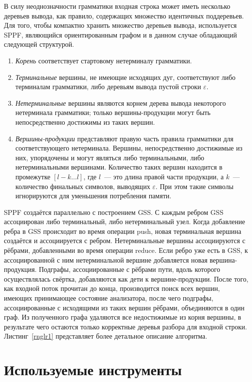 В силу неоднозначности грамматики входная строка может иметь несколько деревьев вывода, как правило, содержащих множество идентичных поддеревьев. Для того, чтобы компактно хранить множество деревьев вывода, используется SPPF, являющийся ориентированным графом и в данном случае обладающий следующей структурой.
\begin{enumerate}
  \item \emph{Корень} соответствует стартовому нетерминалу грамматики.
  \item \emph{Терминальные} вершины, не имеющие исходящих дуг, соответствуют либо терминалам грамматики, либо деревьям вывода пустой строки $\varepsilon$.
  \item \emph{Нетерминальные} вершины являются корнем дерева вывода некоторого нетерминала грамматики; только вершины-продукции могут быть непосредственно достижимы из таких вершин.
  \item \emph{Вершины-продукции} представляют правую часть правила грамматики для соответствующего нетерминала. Вершины, непосредственно достижимые из них, упорядочены и могут являться либо терминальными, либо нетерминальными вершинами. Количество таких вершин находится в промежутке $[l - k \dots l]$, где $l$~--- это длина правой части продукции, а $k$~--- количество финальных символов, выводящих $\varepsilon$. При этом такие символы игнорируются для уменьшения потребления памяти.
\end{enumerate}

SPPF создаётся параллельно с построением GSS. С каждым ребром GSS ассоциирован либо терминальный, либо нетерминальный узел. Когда добавление ребра в GSS происходит во время операции push, новая терминальная вершина создаётся и ассоциируется с ребром. Нетерминальные вершины ассоциируются с рёбрами, добавленными во время операции reduce. Если ребро уже есть в GSS, к ассоциированной с ним нетерминальной вершине добавляется новая вершина-продукция. Подграфы, ассоциированные с рёбрами пути, вдоль которого осуществлялась свёртка, добавляются как дети к вершине-продукции. После того, как входной поток прочитан до конца, производится поиск всех вершин, имеющих принимающее состояние анализатора, после чего подграфы, ассоциированные с исходящими из таких вершин рёбрами, объединяются в один граф. Из полученного графа удаляются все недостижимые из корня вершины, в результате чего остаются только корректные деревья разбора для входной строки. Листинг~\ref{rnglr1} представляет более детальное описание алгоритма.

    
\section{Используемые инструменты}

